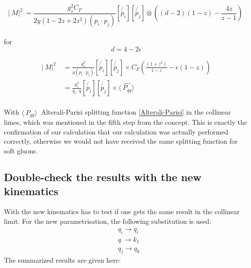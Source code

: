 \begin{equation}
\lvert\:M\lvert^2\: = \frac{g_s^2 C_F}{2y(1-2z+2z^2)(p_i \cdot p_j)}[\not{p_i}][\not{p_j}] \otimes((d-2)(1-z)-\frac{4z}{z-1})\:
\end{equation}
\\
for
\begin{equation}
d=4-2\epsilon
\end{equation}

\begin{equation}
\begin{split}
\lvert\:M\lvert^2\: &=\frac{g_s^2}{y(p_i \cdot p_j)}[\not{p_i}][\not{p_j}]\times C_F(\frac{(1+z^2)}{1-z}-\epsilon(1-z))\\
&=\frac{g_s^2}{q_i \cdot q}[\not{p_i}][\not{p_j}]\times \langle\:\hat{P_{qq}}\rangle\:\\
\label{coll}
\end{split}
\end{equation}

With $ \langle\:\hat{P_{qq}}\rangle\: $ Alterali-Parisi splitting function \ref{Alterali-Parisi}  in the collinear limes, which was mentioned in the fifth step from the concept. This is exactly the confirmation of our calculation that our calculation was actually performed correctly, otherwise we would not have received the same splitting function for soft gluons.


\subsection{Double-check the results with the new kinematics}
With the new kinematics has to test if one gets the same result in the collinear limit. For the new parametrisation, the following substitution is used:
\begin{equation}
\begin{split}
&q_i \rightarrow q_i\\
&q \: \rightarrow k_1\\
&q_j \rightarrow q_k
\end{split}
\end{equation}
The summarized results are given here: 
